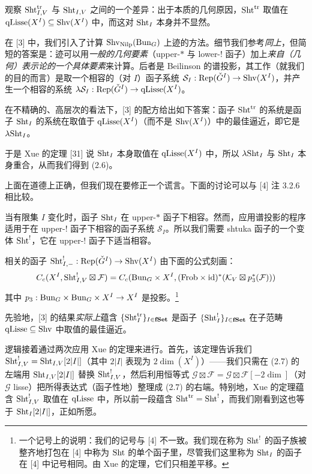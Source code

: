  观察 $\mathrm{Sht}^{\mathrm{tr}}_{I,V}$ 与 $\mathrm{Sht}_{I,V}$ 之间的一个差异：出于本质的几何原因，$\mathrm{Sht}^{\mathrm{tr}}$ 取值在 $\mathrm{qLisse}(X^I) \subseteq \mathrm{Shv}(X^I)$ 中，而这对 $\mathrm{Sht}_I$ 本身并不显然。

在 [3] 中，我们引入了计算 $\mathrm{Shv}_{\mathrm{Nilp}}(\mathrm{Bun}_G)$ 上迹的方法。细节我们参考\emph{同上}，但简短的答案是：迹可以用\emph{一般的几何要素}（upper-$*$ 与 lower-$!$ 函子）加上\emph{来自（几何）表示论的一个具体要素}来计算。后者是 Beilinson 的谱投影，其工作（就我们的目的而言）是取一个相容的（对 $I$）函子系统 $\mathcal{S}_I: \mathrm{Rep}(\check{G}^I) \to \mathrm{Shv}(X^I)$，并产生一个相容的系统 $\lambda \mathcal{S}_I: \mathrm{Rep}(\check{G}^I) \to \mathrm{qLisse}(X^I)$。

在不精确的、高层次的看法下，[3] 的配方给出如下答案：函子 $\mathrm{Sht}^{\mathrm{tr}}$ 的系统是函子 $\mathrm{Sht}_I$ 的系统在取值于 $\mathrm{qLisse}(X^I)$（而不是 $\mathrm{Shv}(X^I)$）中的最佳逼近，即它是 $\lambda \mathrm{Sht}_I$。

于是 Xue 的定理 [31] 说 $\mathrm{Sht}_I$ 本身取值在 $\mathrm{qLisse}(X^I)$ 中，所以 $\lambda \mathrm{Sht}_I$ 与 $\mathrm{Sht}_I$ 本身重合，从而我们得到 (2.6)。

 上面在道德上正确，但我们现在要修正一个谎言。下面的讨论可以与 [4] 注 3.2.6 相比较。

当有限集 $I$ 变化时，函子 $\mathrm{Sht}_I$ 在 upper-$*$ 函子下相容。然而，应用谱投影的程序适用于在 upper-$!$ 函子下相容的函子系统 $\mathcal{S}_I$。所以我们需要 shtuka 函子的一个变体 $\mathrm{Sht}^!$，它在 upper-$!$ 函子下适当相容。

相关的函子 $\mathrm{Sht}^!_{I,-}: \mathrm{Rep}(\check{G}^I) \to \mathrm{Shv}(X^I)$ 由下面的公式刻画：
\begin{equation}
  C_c(X^I, \mathrm{Sht}^!_{I,V} \boxtimes \mathcal{F}) = C_c(\mathrm{Bun}_G \times X^I, (\mathrm{Frob} \times \mathrm{id})^*(\mathcal{K}_V \boxtimes p_3^*(\mathcal{F})))
\end{equation}
其中 $p_3: \mathrm{Bun}_G \times \mathrm{Bun}_G \times X^I \to X^I$ 是投影。\footnote{一个记号上的说明：我们的记号与 [4] 不一致。我们现在称为 $\mathrm{Sht}^!$ 的函子族被整齐地打包在 [4] 中称为 $\mathrm{Sht}$ 的单个函子里，尽管我们这里称为 $\mathrm{Sht}_I$ 的函子在 [4] 中记号相同。由 Xue 的定理，它们只相差平移。}

先验地，[3] 的结果\emph{实际上}蕴含 $\{\mathrm{Sht}^{\mathrm{tr}}_I\}_{I \in \mathbf{fSet}}$ 是函子 $\{\mathrm{Sht}^!_I\}_{I \in \mathbf{fSet}}$ 在子范畴 $\mathrm{qLisse} \subseteq \mathrm{Shv}$ 中取值的最佳逼近。

逻辑接着通过两次应用 Xue 的定理来进行。首先，该定理告诉我们 $\mathrm{Sht}^!_{I,V} = \mathrm{Sht}_{I,V}[2|I|]$（其中 $2|I|$ 表现为 $2\dim(X^I)$）——我们只需在 (2.7) 的左端用 $\mathrm{Sht}_{I,V}[2|I|]$ 替换 $\mathrm{Sht}^!_{I,V}$，然后利用恒等式 $\mathcal{G} \boxtimes \mathcal{F} = \mathcal{G} \boxtimes \mathcal{F}[-2\dim]$（对 $\mathcal{G}$ lisse）把所得表达式（函子性地）整理成 (2.7) 的右端。特别地，Xue 的定理蕴含 $\mathrm{Sht}^!_{I,V}$ 取值在 $\mathrm{qLisse}$ 中，所以前一段蕴含 $\mathrm{Sht}^{\mathrm{tr}} = \mathrm{Sht}^!$，而我们刚看到这也等于 $\mathrm{Sht}_I[2|I|]$，正如所愿。
